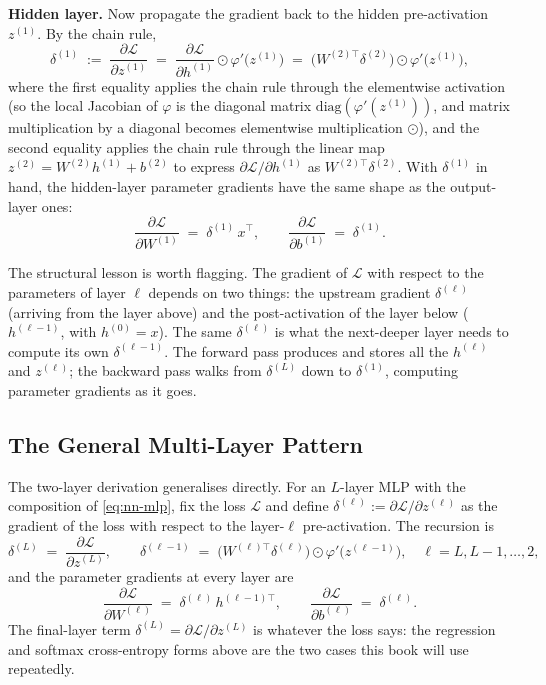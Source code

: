 \textbf{Hidden layer.} Now propagate the gradient back to the
hidden pre-activation $z^{(1)}$. By the chain rule,
\[
  \delta^{(1)}
  \;:=\; \frac{\partial \mathcal{L}}{\partial z^{(1)}}
  \;=\; \frac{\partial \mathcal{L}}{\partial h^{(1)}}
        \odot \varphi'\!\bigl(z^{(1)}\bigr)
  \;=\; \bigl(W^{(2)\top} \delta^{(2)}\bigr)
        \odot \varphi'\!\bigl(z^{(1)}\bigr),
\]
where the first equality applies the chain rule through the
elementwise activation (so the local Jacobian of $\varphi$ is the
diagonal matrix $\mathrm{diag}(\varphi'(z^{(1)}))$, and matrix
multiplication by a diagonal becomes elementwise multiplication
$\odot$), and the second equality applies the chain rule through
the linear map $z^{(2)} = W^{(2)} h^{(1)} + b^{(2)}$ to express
$\partial \mathcal{L} / \partial h^{(1)}$ as $W^{(2)\top}
\delta^{(2)}$. With $\delta^{(1)}$ in hand, the hidden-layer
parameter gradients have the same shape as the output-layer ones:
\[
  \frac{\partial \mathcal{L}}{\partial W^{(1)}}
  \;=\; \delta^{(1)} \, x^\top,
  \qquad
  \frac{\partial \mathcal{L}}{\partial b^{(1)}}
  \;=\; \delta^{(1)}.
\]

The structural lesson is worth flagging. The gradient of
$\mathcal{L}$ with respect to the parameters of layer $\ell$
depends on two things: the upstream gradient $\delta^{(\ell)}$
(arriving from the layer above) and the post-activation of the
layer below ($h^{(\ell-1)}$, with $h^{(0)} = x$). The same
$\delta^{(\ell)}$ is what the next-deeper layer needs to compute
its own $\delta^{(\ell-1)}$. The forward pass produces and stores
all the $h^{(\ell)}$ and $z^{(\ell)}$; the backward pass walks
from $\delta^{(L)}$ down to $\delta^{(1)}$, computing parameter
gradients as it goes.

\subsection{The General Multi-Layer Pattern}

The two-layer derivation generalises directly. For an $L$-layer
MLP with the composition of \eqref{eq:nn-mlp}, fix the loss
$\mathcal{L}$ and define $\delta^{(\ell)} := \partial \mathcal{L}
/ \partial z^{(\ell)}$ as the gradient of the loss with respect
to the layer-$\ell$ pre-activation. The recursion is
\begin{equation}
  \delta^{(L)}
  \;=\; \frac{\partial \mathcal{L}}{\partial z^{(L)}},
  \qquad
  \delta^{(\ell-1)}
  \;=\; \bigl(W^{(\ell)\top} \delta^{(\ell)}\bigr)
        \odot \varphi'\!\bigl(z^{(\ell-1)}\bigr),
  \quad \ell = L, L-1, \dots, 2,
  \label{eq:nn-delta-recursion}
\end{equation}
and the parameter gradients at every layer are
\begin{equation}
  \frac{\partial \mathcal{L}}{\partial W^{(\ell)}}
  \;=\; \delta^{(\ell)} \, h^{(\ell-1)\top},
  \qquad
  \frac{\partial \mathcal{L}}{\partial b^{(\ell)}}
  \;=\; \delta^{(\ell)}.
  \label{eq:nn-param-grads}
\end{equation}
The final-layer term $\delta^{(L)} = \partial \mathcal{L} /
\partial z^{(L)}$ is whatever the loss says: the regression and
softmax cross-entropy forms above are the two cases this book
will use repeatedly.

